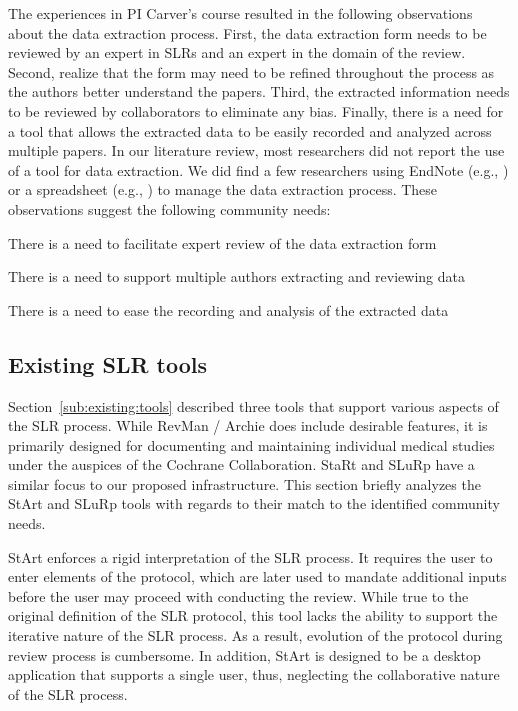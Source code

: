 The experiences in PI Carver's course resulted in the following observations about the data extraction process. First, the data extraction form needs to be reviewed by an expert in SLRs and an expert in the domain of the review. Second, realize that the form may need to be refined throughout the process as the authors better understand the papers. Third, the extracted information needs to be reviewed by collaborators to eliminate any bias. Finally, there is a need for a tool that allows the extracted data to be easily recorded and analyzed across multiple papers. In our literature review, most researchers did not report the use of a tool for data extraction. We did find a few researchers using EndNote (e.g., \cite{CarlaPacheco_et_al_2012,LEfrizoni_et_al_2010,HongyuPeiBreivold_et_al_2012}) or a spreadsheet (e.g., \cite{LianpingChen_et_al_2011,HongyuPeiBreivold_et_al_2012,ShaukatAli_et_al_2010,SamirehJalali_et_al_2010}) to manage the data extraction process. These observations suggest the following community needs:
\begin{itemize*}
\begin{bfseries}
\item There is a need to facilitate expert review of the data extraction form
\item There is a need to support multiple authors extracting and reviewing data
\item There is a need to ease the recording and analysis of the extracted data
\end{bfseries}
\end{itemize*}


\subsection{Existing SLR tools}
Section~\ref{sub:existing:tools} described three tools that support various aspects of the SLR process. While RevMan / Archie does include desirable features, it is primarily designed for documenting and maintaining individual medical studies under the auspices of the Cochrane Collaboration. StaRt and SLuRp have a similar focus to our proposed infrastructure. This section briefly analyzes the StArt and SLuRp tools with regards to their match to the identified community needs.

StArt enforces a rigid interpretation of the SLR process. It requires the user to enter elements of the protocol, which are later used to mandate additional inputs before the user may proceed with conducting the review. While true to the original definition of the SLR protocol, this tool lacks the ability to support the iterative nature of the SLR process. As a result, evolution of the protocol during review process is cumbersome. In addition, StArt is designed to be a desktop application that supports a single user, thus, neglecting the collaborative nature of the SLR process.

